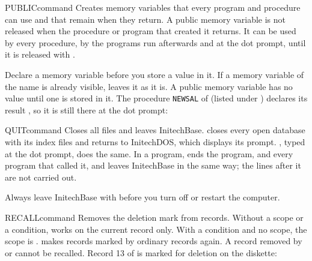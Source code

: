 \begin{XbaseEntry}{PUBLIC}{command}
Creates memory variables that every program and procedure can use and that
remain when they return.
\Syntax
{}
\Usage
A public memory variable is not released when the procedure or program that
created it returns.  It can be used by every procedure, by the programs run
afterwards and at the dot prompt, until it is released with .

Declare a memory variable  before you store a value in it.  If a
memory variable of the name is already visible,  leaves it as it
is.  A public memory variable has no value until one is stored in it.
\Examples
The procedure \texttt{NEWSAL} of  (listed under )
declares its result , so it is still there at the dot prompt:
\end{XbaseEntry}

\begin{XbaseEntry}{QUIT}{command}
Closes all files and leaves InitechBase.
\Syntax
{}
\Usage
{} closes every open database with its index files and returns to
InitechDOS, which displays its prompt.  , typed at the dot prompt,
does the same.  In a program,  ends the program, and every program
that called it, and leaves InitechBase in the same way; the lines after it are
not carried out.

Always leave InitechBase with  before you turn off or restart the
computer.
\Examples
{}
\end{XbaseEntry}

\begin{XbaseEntry}{RECALL}{command}
Removes the deletion mark from records.
\Syntax
{}
\Defaults
Without a scope or a condition,  works on the current record
only.  With a  condition and no scope, the scope is .
\Usage
{} makes records marked by  ordinary records again.  A
record removed by  or  cannot be recalled.
\Examples
Record 13 of  is marked for deletion on the diskette:
\end{XbaseEntry}

